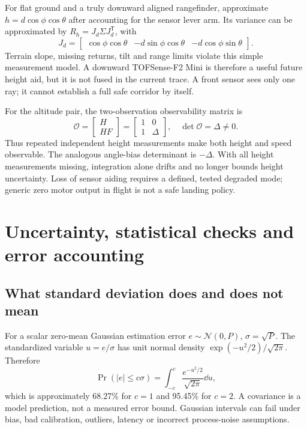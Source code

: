 For flat ground and a truly downward aligned rangefinder, approximate
$h=d\cos\phi\cos\theta$ after accounting for the sensor lever arm. Its
variance can be approximated by $R_h=J_d\Sigma J_d^{\mathsf T}$, with
\begin{equation}
J_d=\begin{bmatrix}\cos\phi\cos\theta&-d\sin\phi\cos\theta&-d\cos\phi\sin\theta\end{bmatrix}.
\end{equation}
Terrain slope, missing returns, tilt and range limits violate this simple
measurement model. A downward TOFSense-F2 Mini is therefore a useful future
height aid, but it is not fused in the current trace. A front sensor sees
only one ray; it cannot establish a full safe corridor by itself.

For the altitude pair, the two-observation observability matrix is
\begin{equation}
\mathcal O=\begin{bmatrix}H\\HF\end{bmatrix}
=\begin{bmatrix}1&0\\1&\Delta\end{bmatrix},\quad
\det\mathcal O=\Delta\ne0.
\end{equation}
Thus repeated independent height measurements make both height and speed
observable. The analogous angle-bias determinant is $-\Delta$. With all
height measurements missing, integration alone drifts and no longer bounds
height uncertainty. Loss of sensor aiding requires a defined, tested degraded
mode; generic zero motor output in flight is not a safe landing policy.

\chapter{Uncertainty, statistical checks and error accounting}
\section{What standard deviation does and does not mean}
For a scalar zero-mean Gaussian estimation error $e\sim\mathcal N(0,P)$,
$\sigma=\sqrt P$. The standardized variable $u=e/\sigma$ has unit normal
density $\exp(-u^2/2)/\sqrt{2\pi}$. Therefore
\begin{equation}
\Pr(|e|\leq c\sigma)=\int_{-c}^c\frac{e^{-u^2/2}}{\sqrt{2\pi}}\dd u,
\end{equation}
which is approximately 68.27\% for $c=1$ and 95.45\% for $c=2$.
A covariance is a model prediction, not a measured error bound. Gaussian
intervals can fail under bias, bad calibration, outliers, latency or incorrect
process-noise assumptions.

